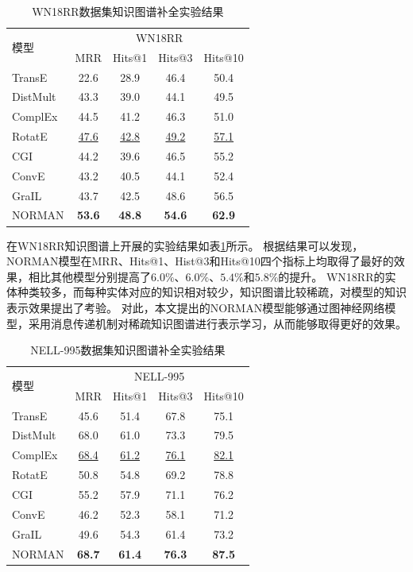 \documentclass[algorithmlist, AutoFakeBold, AutoFakeSlant, figurelist, tablelist, nomlist, engineering, openany]{seuthesix} %
\begin{document}
\begin{table}[t]
  \centering
  \caption{WN18RR数据集知识图谱补全实验结果}
  \begin{tabular*}{0.95\textwidth}{@{\extracolsep{\fill}}lcccc}
    \toprule[1pt]
    \multirow{2}{*}{模型} & \multicolumn{4}{c}{WN18RR} \\
      & MRR & Hits@1 & Hits@3 & Hits@10 \\ \hline
    TransE & 22.6 & 28.9 & 46.4 & 50.4 \\
    DistMult & 43.3 & 39.0 & 44.1 & 49.5 \\
    ComplEx & 44.5 & 41.2 & 46.3 & 51.0 \\
    RotatE & \underline{47.6} & \underline{42.8} & \underline{49.2} & \underline{57.1} \\
    CGI & 44.2 & 39.6 & 46.5 & 55.2 \\
    ConvE & 43.2 & 40.5 & 44.1 & 52.4 \\
    GraIL & 43.7 & 42.5 & 48.6 & 56.5 \\
    NORMAN & \textbf{53.6} & \textbf{48.8} & \textbf{54.6} & \textbf{62.9} \\
    \bottomrule[1pt]
  \end{tabular*}
  \label{Experiment1_WN18RR}
\end{table}

在WN18RR知识图谱上开展的实验结果如表\ref{Experiment1_WN18RR}所示。
根据结果可以发现，NORMAN模型在MRR、Hits@1、Hist@3和Hits@10四个指标上均取得了最好的效果，相比其他模型分别提高了$6.0\%$、$6.0\%$、$5.4\%$和$5.8\%$的提升。
WN18RR的实体种类较多，而每种实体对应的知识相对较少，知识图谱比较稀疏，对模型的知识表示效果提出了考验。
对此，本文提出的NORMAN模型能够通过图神经网络模型，采用消息传递机制对稀疏知识图谱进行表示学习，从而能够取得更好的效果。

\begin{table}[t]
  \centering
  \caption{NELL-995数据集知识图谱补全实验结果}
  \begin{tabular*}{0.95\textwidth}{@{\extracolsep{\fill}}lcccc}
    \toprule[1pt]
    \multirow{2}{*}{模型} & \multicolumn{4}{c}{NELL-995} \\
      & MRR & Hits@1 & Hits@3 & Hits@10 \\ \hline
    TransE & 45.6 & 51.4 & 67.8 & 75.1 \\
    DistMult & 68.0 & 61.0 & 73.3 & 79.5 \\
    ComplEx & \underline{68.4} & \underline{61.2} & \underline{76.1} & \underline{82.1} \\
    RotatE & 50.8 & 54.8 & 69.2 & 78.8 \\
    CGI & 55.2 & 57.9 & 71.1 & 76.2 \\
    ConvE & 46.2 & 52.3 & 58.1 & 71.2 \\
    GraIL & 49.6 & 54.3 & 61.4 & 73.2 \\
    NORMAN & \textbf{68.7} & \textbf{61.4} & \textbf{76.3} & \textbf{87.5} \\
    \bottomrule[1pt]
  \end{tabular*}
  \label{Experiment1_NELL-995}
\end{table}
\end{document}
